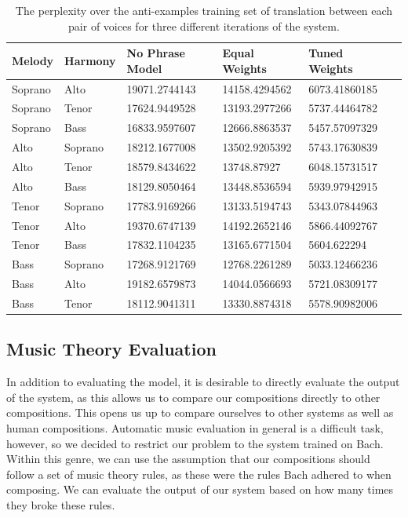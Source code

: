 \documentclass{sig-alternate}
\begin{document}
\begin{table}[t]
      \begin{tabular}{| l | l | l | l | l | l |}
      \hline
     Melody & Harmony & No Phrase Model & Equal Weights & Tuned Weights \\ \hline
     Soprano & Alto & 19071.2744143 & 14158.4294562 & 6073.41860185 \\ 
     Soprano & Tenor & 17624.9449528 & 13193.2977266 & 5737.44464782 \\ 
     Soprano & Bass & 16833.9597607 & 12666.8863537 & 5457.57097329 \\ 
     Alto & Soprano & 18212.1677008 & 13502.9205392 & 5743.17630839 \\ 
     Alto & Tenor & 18579.8434622 & 13748.87927 & 6048.15731517 \\ 
     Alto & Bass & 18129.8050464 & 13448.8536594 & 5939.97942915 \\ 
     Tenor & Soprano & 17783.9169266 & 13133.5194743 & 5343.07844963 \\ 
     Tenor & Alto & 19370.6747139 & 14192.2652146 & 5866.44092767 \\ 
     Tenor & Bass & 17832.1104235 & 13165.6771504 & 5604.622294 \\ 
     Bass & Soprano & 17268.9121769 & 12768.2261289 & 5033.12466236\\ 
     Bass & Alto & 19182.6579873 & 14044.0566693 & 5721.08309177 \\ 
     Bass & Tenor & 18112.9041311 & 13330.8874318 & 5578.90982006 \\ \hline
        \end{tabular}
  \caption{The perplexity over the anti-examples training set of translation between each pair of voices for three different iterations of the system.}
\end{table}


\subsection{Music Theory Evaluation}

In addition to evaluating the model, it is desirable to directly evaluate the output of the system, as this allows us to compare our compositions directly to other compositions. This opens us up to compare ourselves to other systems as well as human compositions. Automatic music evaluation in general is a difficult task, however, so we decided to restrict our problem to the system trained on Bach. Within this genre, we can use the assumption that our compositions should follow a set of music theory rules, as these were the rules Bach adhered to when composing. We can evaluate the output of our system based on how many times they broke these rules.
\end{document}
